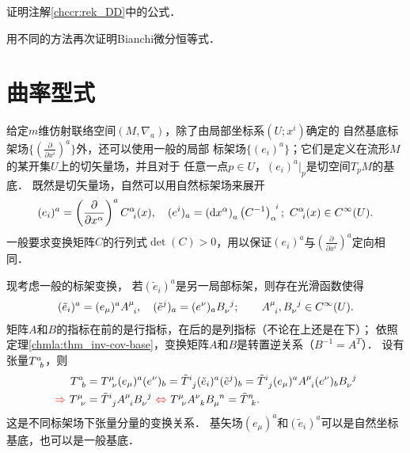 \begin{exercise}
	证明注解\ref{chccr:rek_DD}中的公式．
\end{exercise}


\begin{exercise}
	用不同的方法再次证明Bianchi微分恒等式．
\end{exercise}


\section{曲率型式}\label{chccr:sec_form1}
给定$m$维仿射联络空间$(M,\nabla_a)$，除了由局部坐标系$(U;x^i)$确定的
自然基底标架场$\{(\frac{\partial}{\partial x^i})^a\}$外，还可以使用一般的局部
标架场$\{(e_i)^a\}$；它们是定义在流形$M$的某开集$U$上的切矢量场，并且对于
任意一点$p\in U$，$(e_i)^a|_p$是切空间$T_p M$的基底．
既然是切矢量场，自然可以用自然标架场来展开
\begin{align}\label{chccr:eqn_natural-base_change}
    ({e} _i)^a = \left(\frac{\partial}{\partial x^\alpha}\right)^a C_{\hphantom{a} i}^{\alpha}(x) , \quad
    ({e} ^i)_a = \left({\rm d} x^\alpha \right)_a \left(C^{-1}\right)^{\hphantom{a} i}_{\alpha}   ;
    \ C_{\hphantom{a} i}^{\alpha}(x) \in C^{\infty}(U).
\end{align}
一般要求变换矩阵$C$的行列式$\det(C)>0$，用以保证$(e_i)^a$与$(\frac{\partial}{\partial x^i})^a$定向相同．



现考虑一般的标架变换，
若$(\tilde{e}_i)^a$是另一局部标架，则存在光滑函数使得
\begin{align}\label{chccr:base_change}
    (\tilde{e} _i)^a = (e_\mu)^{a} A_{\hphantom{a} i}^{\mu} , \quad
    (\tilde{e} ^j)_a = (e^\nu)_{a} B^{\hphantom{a} j}_{\nu};
    \qquad A_{\hphantom{a} i}^{\mu},B^{\hphantom{a} j}_{\nu} \in C^{\infty}(U) .
\end{align}
矩阵$A$和$B$的指标在前的是行指标，在后的是列指标（不论在上还是在下）；
依照定理\ref{chmla:thm_inv-cov-base}，变换矩阵$A$和$B$是转置逆关系（$B^{-1} = A^T$）．
设有张量$T^a _{\hphantom{a} b}$，则
\begin{align}
    T^a _{\hphantom{a} b} &= T^{\mu} _{\hphantom{a} \nu}(e_\mu)^{a} (e^\nu)_{b}
    = \tilde{T}^{i} _{\hphantom{a} j} (\tilde{e} _i)^a (\tilde{e} ^j)_b
    = \tilde{T}^{i} _{\hphantom{a} j} (e_\mu)^{a} A_{\hphantom{a} i}^{\mu} (e^\nu)_{b} B^{\hphantom{a} j}_{\nu}
    \notag \\ {\color{red}\Rightarrow \ }
    T^{\mu} _{\hphantom{a} \nu} &= \tilde{T}^{i} _{\hphantom{a} j} A_{\hphantom{a} i}^{\mu} B^{\hphantom{a} j}_{\nu}
    {\ \color{red}\Leftrightarrow\ }
    T^{\mu} _{\hphantom{a} \nu} A_{\hphantom{a} k}^{\nu}  B^{\hphantom{a} n}_{\mu} = \tilde{T}^{n} _{\hphantom{a} k} .
\end{align}
这是不同标架场下张量分量的变换关系．
基矢场$(e_\mu)^{a}$和$(\tilde{e} _i)^a$可以是自然坐标基底，也可以是一般基底．

